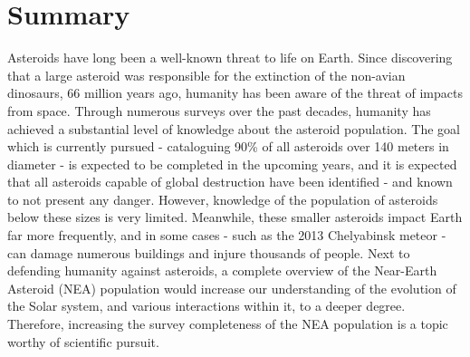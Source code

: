 \chapter{Summary}

Asteroids have long been a well-known threat to life on Earth. Since discovering that a large asteroid was responsible for the extinction of the non-avian dinosaurs, 66 million years ago, humanity has been aware of the threat of impacts from space. Through numerous surveys over the past decades, humanity has achieved a substantial level of knowledge about the asteroid population. The goal which is currently pursued - cataloguing 90\% of all asteroids over 140 meters in diameter - is expected to be completed in the upcoming years, and it is expected that all asteroids capable of global destruction have been identified - and known to not present any danger. However, knowledge of the population of asteroids below these sizes is very limited. Meanwhile, these smaller asteroids impact Earth far more frequently, and in some cases - such as the 2013 Chelyabinsk meteor - can damage numerous buildings and injure thousands of people. Next to defending humanity against asteroids, a complete overview of the Near-Earth Asteroid (NEA) population would increase our understanding of the evolution of the Solar system, and various interactions within it, to a deeper degree. Therefore, increasing the survey completeness of the NEA population is a topic worthy of scientific pursuit. \\

